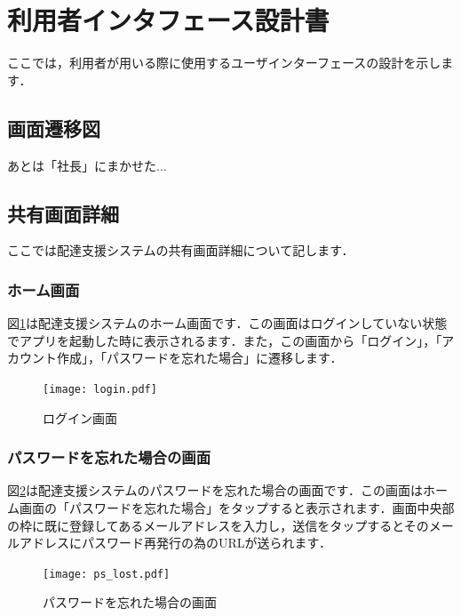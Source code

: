 \documentclass[a4j,titlepage]{jarticle}
\begin{document}
\section{利用者インタフェース設計書}
ここでは，利用者が用いる際に使用するユーザインターフェースの設計を示します．

\subsection{画面遷移図}
あとは「社長」にまかせた...

\subsection{共有画面詳細}
ここでは配達支援システムの共有画面詳細について記します．

\subsubsection{ホーム画面}
図\ref{fig:login}は配達支援システムのホーム画面です．この画面はログインしていない状態でアプリを起動した時に表示されるます．また，この画面から「ログイン」，「アカウント作成」，「パスワードを忘れた場合」に遷移します．

\begin{figure}[htbp]
 \begin{center}
  \texttt{[image: login.pdf]}
	\caption{ログイン画面}
	\label{fig:login}
 \end{center}

\end{figure}


\subsubsection{パスワードを忘れた場合の画面}
図\ref{fig:ps_lost}は配達支援システムのパスワードを忘れた場合の画面です．この画面はホーム画面の「パスワードを忘れた場合」をタップすると表示されます．画面中央部の枠に既に登録してあるメールアドレスを入力し，送信をタップするとそのメールアドレスにパスワード再発行の為のURLが送られます．

\begin{figure}[htbp]
 \begin{center}
  \texttt{[image: ps\_lost.pdf]}
	\caption{パスワードを忘れた場合の画面}
	\label{fig:ps_lost}
 \end{center}

\end{figure}
\end{document}

